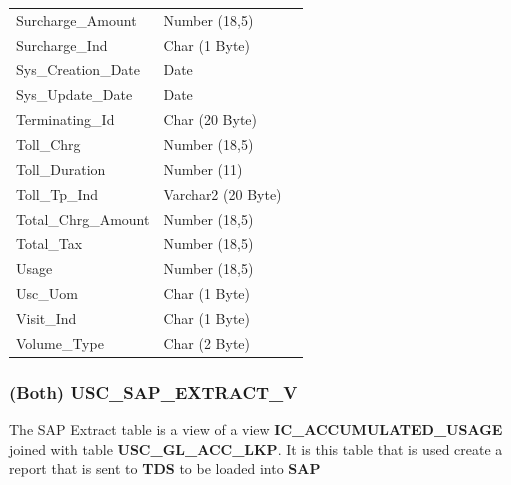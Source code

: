 \documentclass[12pt,twoside]{article}
\begin{document}
\begin{longtable}{l|l|l}
Surcharge\_Amount & Number (18,5) & \\
Surcharge\_Ind & Char (1 Byte) & \\
Sys\_Creation\_Date & Date & \\
Sys\_Update\_Date & Date & \\
Terminating\_Id & Char (20 Byte) & \\
Toll\_Chrg & Number (18,5) & \\
Toll\_Duration & Number (11) & \\
Toll\_Tp\_Ind & Varchar2 (20 Byte) & \\
Total\_Chrg\_Amount & Number (18,5) & \\
Total\_Tax & Number (18,5) & \\
Usage & Number (18,5) & \\
Usc\_Uom & Char (1 Byte) & \\
Visit\_Ind & Char (1 Byte) & \\
Volume\_Type & Char (2 Byte) & \\
\hline
\end{longtable}
\normalsize
\subsubsection{(Both) USC\_SAP\_EXTRACT\_V}
\label{sec:orgheadline137}
The SAP Extract table is a view of a view \textbf{IC\_ACCUMULATED\_USAGE} joined with table \textbf{USC\_GL\_ACC\_LKP}. It is this table that is used create a report that is sent to \textbf{TDS} to be loaded into \textbf{SAP}
\footnotesize
\end{document}
